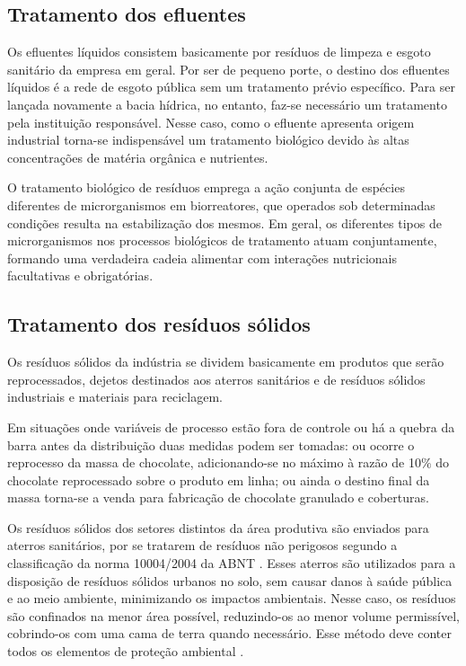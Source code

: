 \documentclass[
	12pt,				%
	openright,			%
	oneside,			%
	a4paper,			%
	english,			%
	french,				%
	spanish,			%
	brazil				%
	]{abntex2}
\begin{document}
\subsection{Tratamento dos efluentes}

Os efluentes líquidos consistem basicamente por resíduos de limpeza e esgoto
sanitário da empresa em geral. Por ser de pequeno porte, o destino dos efluentes líquidos é a
rede de esgoto pública sem um tratamento prévio específico.
Para ser lançada novamente a bacia hídrica, no entanto, faz-se necessário um
tratamento pela instituição responsável. Nesse caso, como o efluente apresenta origem
industrial torna-se indispensável um tratamento biológico devido às altas concentrações de
matéria orgânica e nutrientes.

O tratamento biológico de resíduos emprega a ação conjunta de espécies diferentes de
microrganismos em biorreatores, que operados sob determinadas condições resulta na
estabilização dos mesmos. Em geral, os diferentes tipos de microrganismos nos processos
biológicos de tratamento atuam conjuntamente, formando uma verdadeira cadeia alimentar
com interações nutricionais facultativas e obrigatórias.

\subsection{Tratamento dos resíduos sólidos}

Os resíduos sólidos da indústria se dividem basicamente em produtos que serão
reprocessados, dejetos destinados aos aterros sanitários e de resíduos sólidos industriais e
materiais para reciclagem.

Em situações onde variáveis de processo estão fora de controle ou há a quebra da barra
antes da distribuição duas medidas podem ser tomadas: ou ocorre o reprocesso da massa de
chocolate, adicionando-se no máximo à razão de 10$\%$ do chocolate reprocessado sobre o
produto em linha; ou ainda o destino final da massa torna-se a venda para fabricação de
chocolate granulado e coberturas.

Os resíduos sólidos dos setores distintos da área produtiva são enviados para aterros
sanitários, por se tratarem de resíduos não perigosos segundo a classificação da norma
10004/2004 da ABNT \cite{ABNT}. Esses aterros são utilizados para a disposição de
resíduos sólidos urbanos no solo, sem causar danos à saúde pública e ao meio ambiente,
minimizando os impactos ambientais. Nesse caso, os resíduos são confinados na menor área
possível, reduzindo-os ao menor volume permissível, cobrindo-os com uma cama de terra
quando necessário. Esse método deve conter todos os elementos de proteção ambiental
\cite{FEAM}.
\end{document}
